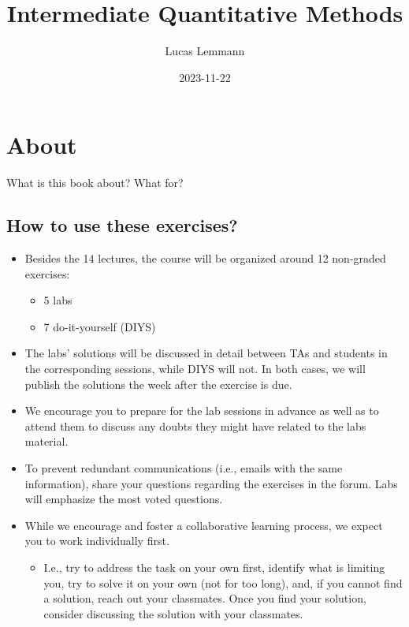 \documentclass[
]{book}
\title{Intermediate Quantitative Methods}
\author{Lucas Lemmann}
\date{2023-11-22}
\providecommand{\tightlist}{%
  \setlength{\itemsep}{0pt}\setlength{\parskip}{0pt}}
\begin{document}
\maketitle

{
\setcounter{tocdepth}{1}
\tableofcontents
}
\hypertarget{about}{%
\chapter*{About}\label{about}}

What is this book about? What for?

\hypertarget{how-to-use-these-exercises}{%
\section{How to use these exercises?}\label{how-to-use-these-exercises}}

\begin{itemize}
\tightlist
\item
  Besides the 14 lectures, the course will be organized around 12 non-graded exercises:

  \begin{itemize}
  \tightlist
  \item
    5 labs
  \item
    7 do-it-yourself (DIYS)
  \end{itemize}
\item
  The labs' solutions will be discussed in detail between TAs and students in the corresponding sessions, while DIYS will not. In both cases, we will publish the solutions the week after the exercise is due.
\item
  We encourage you to prepare for the lab sessions in advance as well as to attend them to discuss any doubts they might have related to the labs material.
\item
  To prevent redundant communications (i.e., emails with the same information), share your questions regarding the exercises in the forum. Labs will emphasize the most voted questions.
\item
  While we encourage and foster a collaborative learning process, we expect you to work individually first.

  \begin{itemize}
  \tightlist
  \item
    I.e., try to address the task on your own first, identify what is limiting you, try to solve it on your own (not for too long), and, if you cannot find a solution, reach out your classmates. Once you find your solution, consider discussing the solution with your classmates.
  \end{itemize}
\end{itemize}
\end{document}
